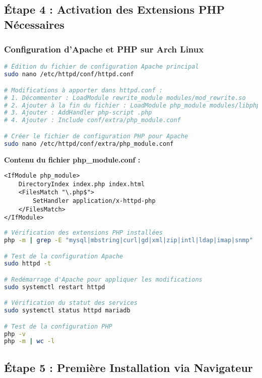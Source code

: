 \documentclass[12pt,a4paper]{article}
\begin{document}
\subsection{Étape 4 : Activation des Extensions PHP Nécessaires}

\subsubsection{Configuration d'Apache et PHP sur Arch Linux}
\begin{lstlisting}[language=bash, caption=Configuration Apache et PHP sur Arch]
# Édition du fichier de configuration Apache principal
sudo nano /etc/httpd/conf/httpd.conf

# Modifications à apporter dans httpd.conf :
# 1. Décommenter : LoadModule rewrite_module modules/mod_rewrite.so
# 2. Ajouter à la fin du fichier : LoadModule php_module modules/libphp.so
# 3. Ajouter : AddHandler php-script .php
# 4. Ajouter : Include conf/extra/php_module.conf

# Créer le fichier de configuration PHP pour Apache
sudo nano /etc/httpd/conf/extra/php_module.conf
\end{lstlisting}

\textbf{Contenu du fichier php\_module.conf :}
\begin{lstlisting}[caption=Configuration PHP pour Apache]
<IfModule php_module>
    DirectoryIndex index.php index.html
    <FilesMatch "\.php$">
        SetHandler application/x-httpd-php
    </FilesMatch>
</IfModule>
\end{lstlisting}

\begin{lstlisting}[language=bash, caption=Test et redémarrage des services]
# Vérification des extensions PHP installées
php -m | grep -E "mysql|mbstring|curl|gd|xml|zip|intl|ldap|imap|snmp"

# Test de la configuration Apache
sudo httpd -t

# Redémarrage d'Apache pour appliquer les modifications
sudo systemctl restart httpd

# Vérification du statut des services
sudo systemctl status httpd mariadb

# Test de la configuration PHP
php -v
php -m | wc -l
\end{lstlisting}

\subsection{Étape 5 : Première Installation via Navigateur}
\end{document}
